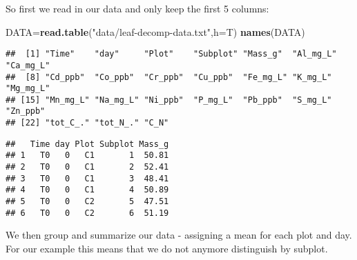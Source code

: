 \documentclass[
]{article}
\newenvironment{Shaded}{\begin{snugshade}}{\end{snugshade}}
\newcommand{\DataTypeTok}[1]{\textcolor[rgb]{0.13,0.29,0.53}{#1}}
\newcommand{\DecValTok}[1]{\textcolor[rgb]{0.00,0.00,0.81}{#1}}
\newcommand{\KeywordTok}[1]{\textcolor[rgb]{0.13,0.29,0.53}{\textbf{#1}}}
\newcommand{\NormalTok}[1]{#1}
\newcommand{\OperatorTok}[1]{\textcolor[rgb]{0.81,0.36,0.00}{\textbf{#1}}}
\newcommand{\StringTok}[1]{\textcolor[rgb]{0.31,0.60,0.02}{#1}}
\begin{document}
So first we read in our data and only keep the first 5 columns:

\begin{Shaded}
\begin{Highlighting}[]
\NormalTok{DATA=}\KeywordTok{read.table}\NormalTok{(}\StringTok{"data/leaf-decomp-data.txt"}\NormalTok{,}\DataTypeTok{h=}\NormalTok{T)}
\KeywordTok{names}\NormalTok{(DATA)}
\end{Highlighting}
\end{Shaded}

\begin{verbatim}
##  [1] "Time"    "day"     "Plot"    "Subplot" "Mass_g"  "Al_mg_L" "Ca_mg_L"
##  [8] "Cd_ppb"  "Co_ppb"  "Cr_ppb"  "Cu_ppb"  "Fe_mg_L" "K_mg_L"  "Mg_mg_L"
## [15] "Mn_mg_L" "Na_mg_L" "Ni_ppb"  "P_mg_L"  "Pb_ppb"  "S_mg_L"  "Zn_ppb" 
## [22] "tot_C_." "tot_N_." "C_N"
\end{verbatim}

\begin{Shaded}
\end{Shaded}

\begin{verbatim}
##   Time day Plot Subplot Mass_g
## 1   T0   0   C1       1  50.81
## 2   T0   0   C1       2  52.41
## 3   T0   0   C1       3  48.41
## 4   T0   0   C1       4  50.89
## 5   T0   0   C2       5  47.51
## 6   T0   0   C2       6  51.19
\end{verbatim}

We then group and summarize our data - assigning a mean for each plot
and day. For our example this means that we do not anymore distinguish
by subplot.

\begin{Shaded}
\end{Shaded}
\end{document}
